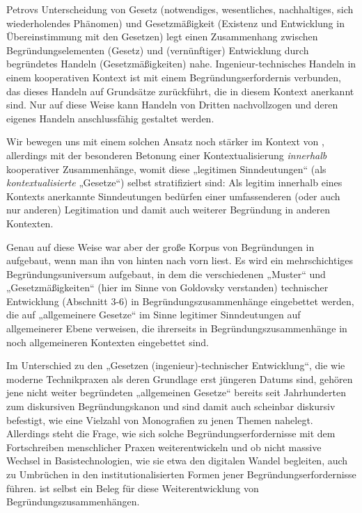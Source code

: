\documentclass[11pt,a4paper]{article}
\begin{document}
Petrovs Unterscheidung von Gesetz (notwendiges, wesentliches, nachhaltiges,
sich wiederholendes Phänomen) und Gesetzmäßigkeit (Existenz und Entwicklung in
Übereinstimmung mit den Gesetzen) legt einen Zusammenhang zwischen
Begründungselementen (Gesetz) und (vernünftiger) Entwicklung durch begründetes
Handeln (Gesetzmäßigkeiten) nahe.  Ingenieur-technisches Handeln in einem
kooperativen Kontext ist mit einem Begründungserfordernis verbunden, das
dieses Handeln auf Grundsätze zurückführt, die in diesem Kontext anerkannt
sind. Nur auf diese Weise kann Handeln von Dritten nachvollzogen und deren
eigenes Handeln anschlussfähig gestaltet werden.

Wir bewegen uns mit einem solchen Ansatz noch stärker im Kontext von
\cite{Berger1969}, allerdings mit der besonderen Betonung einer
Kontextualisierung \emph{innerhalb} kooperativer Zusammenhänge, womit diese
„legitimen Sinndeutungen“ (als \emph{kontextualisierte} „Gesetze“) selbst
stratifiziert sind: Als legitim innerhalb eines Kontexts anerkannte
Sinndeutungen bedürfen einer umfassenderen (oder auch nur anderen)
Legitimation und damit auch weiterer Begründung in anderen Kontexten.

Genau auf diese Weise war aber der große Korpus von Begründungen in
\cite{Goldovsky1983} aufgebaut, wenn man ihn von hinten nach vorn liest. Es
wird ein mehrschichtiges Begründungsuniversum aufgebaut, in dem die
verschiedenen „Muster“ und „Gesetzmäßigkeiten“ (hier im Sinne von Goldovsky
verstanden) technischer Entwicklung (Abschnitt 3-6) in
Begründungszusammenhänge eingebettet werden, die auf „allgemeinere Gesetze“ im
Sinne legitimer Sinndeutungen auf allgemeinerer Ebene verweisen, die
ihrerseits in Begründungszusammenhänge in noch allgemeineren Kontexten
eingebettet sind. 

Im Unterschied zu den „Gesetzen (ingenieur)-technischer Entwicklung“, die wie
moderne Technikpraxen als deren Grundlage erst jüngeren Datums sind, gehören
jene nicht weiter begründeten „allgemeinen Gesetze“ bereits seit Jahrhunderten
zum diskursiven Begründungs\-kanon und sind damit auch scheinbar diskursiv
befestigt, wie eine Vielzahl von Monografien zu jenen Themen nahelegt.
Allerdings steht die Frage, wie sich solche Begründungserfordernisse mit dem
Fortschreiben menschlicher Praxen weiterentwickeln und ob nicht massive
Wechsel in Basistechnologien, wie sie etwa den digitalen Wandel begleiten,
auch zu Umbrüchen in den institutionalisierten Formen jener
Begründungserfordernisse führen.  \cite{Goldovsky1983} ist selbst ein Beleg
für diese Weiterentwicklung von Begründungszusammenhängen.
\end{document}
